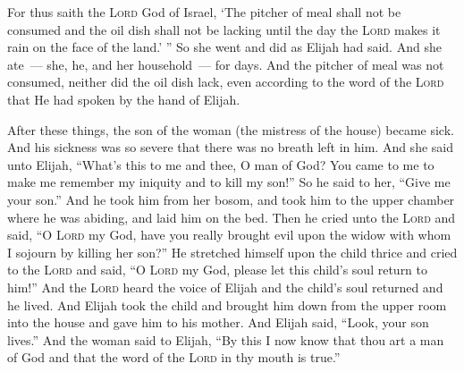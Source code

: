 \begin{inparaenum}
     For thus saith the \textsc{Lord} God of Israel, `The pitcher of meal shall not be consumed and the oil dish shall not be lacking until the day the \textsc{Lord} makes it rain on the face of the land.' ''%
     So she went and did as Elijah had said. And she ate~--- she, he, and her household~--- for days.%
     And the pitcher of meal was not consumed, neither did the oil dish lack, even according to the word of the \textsc{Lord} that He had spoken by the hand of Elijah.%
    
     After these things, the son of the woman (the mistress of the house) became sick. And his sickness was so severe that there was no breath left in him.%
     And she said unto Elijah, ``What's this to me and thee, O man of God? You came to me to make me remember my iniquity and to kill my son!''%
     So he said to her, ``Give me your son.'' And he took him from her bosom, and took him to the upper chamber where he was abiding, and laid him on the bed.%
     Then he cried unto the \textsc{Lord} and said, ``O \textsc{Lord} my God, have you really brought evil upon the widow with whom I sojourn by killing her son?''%
     He stretched himself upon the child thrice and cried to the \textsc{Lord} and said, ``O \textsc{Lord} my God, please let this child's soul return to him!''%
     And the \textsc{Lord} heard the voice of Elijah and the child's soul returned and he lived.%
     And Elijah took the child and brought him down from the upper room into the house and gave him to his mother. And Elijah said, ``Look, your son lives.''%
     And the woman said to Elijah, ``By this I now know that thou art a man of God and that the word of the \textsc{Lord} in thy mouth is true.''%
\end{inparaenum}
